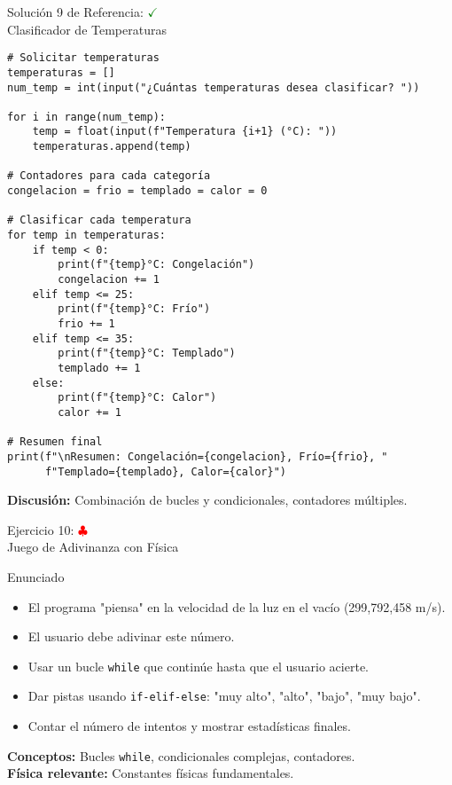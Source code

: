 \documentclass[10pt]{beamer}
\begin{document}
\begin{frame}[fragile]{Solución 9 de Referencia: \hfill \textcolor{green}{$\checkmark$} \\ Clasificador de Temperaturas}
\begin{verbatim}
# Solicitar temperaturas
temperaturas = []
num_temp = int(input("¿Cuántas temperaturas desea clasificar? "))

for i in range(num_temp):
    temp = float(input(f"Temperatura {i+1} (°C): "))
    temperaturas.append(temp)

# Contadores para cada categoría
congelacion = frio = templado = calor = 0

# Clasificar cada temperatura
for temp in temperaturas:
    if temp < 0:
        print(f"{temp}°C: Congelación")
        congelacion += 1
    elif temp <= 25:
        print(f"{temp}°C: Frío")
        frio += 1
    elif temp <= 35:
        print(f"{temp}°C: Templado")
        templado += 1
    else:
        print(f"{temp}°C: Calor")
        calor += 1

# Resumen final
print(f"\nResumen: Congelación={congelacion}, Frío={frio}, "
      f"Templado={templado}, Calor={calor}")
\end{verbatim}
\textbf{Discusión:} Combinación de bucles y condicionales, contadores múltiples.
\end{frame}

\begin{frame}{Ejercicio 10: \hfill \textcolor{red}{$\clubsuit$} \\ Juego de Adivinanza con Física}
  \begin{block}{Enunciado}
    \begin{itemize}
      \item El programa "piensa" en la velocidad de la luz en el vacío (299,792,458 m/s).
      \item El usuario debe adivinar este número.
      \item Usar un bucle \texttt{while} que continúe hasta que el usuario acierte.
      \item Dar pistas usando \texttt{if-elif-else}: "muy alto", "alto", "bajo", "muy bajo".
      \item Contar el número de intentos y mostrar estadísticas finales.
    \end{itemize}
  \end{block}
  
  \textbf{Conceptos:} Bucles \texttt{while}, condicionales complejas, contadores.
  \\
  \textbf{Física relevante:} Constantes físicas fundamentales.
\end{frame}
\end{document}
